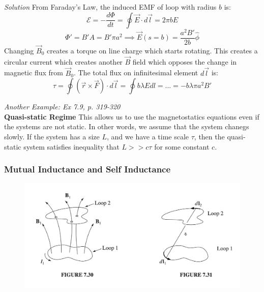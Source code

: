 \documentclass[12pt,a4paper,twoside]{article}
\numberwithin{equation}{section}
\begin{document}
\noindent \textit{Solution} From Faraday's Law, the induced EMF of loop with radius $b$ is:
\[\mathcal{E}=-\frac{d\Phi}{dt}=\oint\overrightarrow{E}\cdot d\overrightarrow{l}=2\pi bE\]
\[\Phi'=B'A=B'\pi a^2\implies \overrightarrow{E}(s=b)=\frac{a^2 B'}{2b}\hat{\phi}\]
Changing $\overrightarrow{B}_0$ creates a torque on line charge which starts rotating. This creates a circular current which creates another $\overrightarrow{B}$ field which opposes the change in magnetic flux from $\overrightarrow{B}_0$. The total flux on infinitesimal element $d\overrightarrow{l}$ is:
\[\tau=\oint (\overrightarrow{r}\times\overrightarrow{F})\cdot d\overrightarrow{l}=\oint b\lambda Edl=...=-b\lambda \pi a^2B'\]

\noindent \textit{Another Example: Ex 7.9, p. 319-320}\\

\noindent \textbf{Quasi-static Regime} This allows us to use the magnetostatics equations even if the systems are not static. In other words, we assume that the system chanegs slowly. If the system has a size $L$, and we have a time scale $\tau$, then the quasi-static system satisfies inequality that $L>>c\tau$ for some constant $c$.
\subsubsection{Mutual Inductance and Self Inductance}
\begin{figure}[ht]
    \centering
    \includegraphics[width=12cm]{250-Revision/mutual-inductance.png}
\end{figure}
\end{document}
